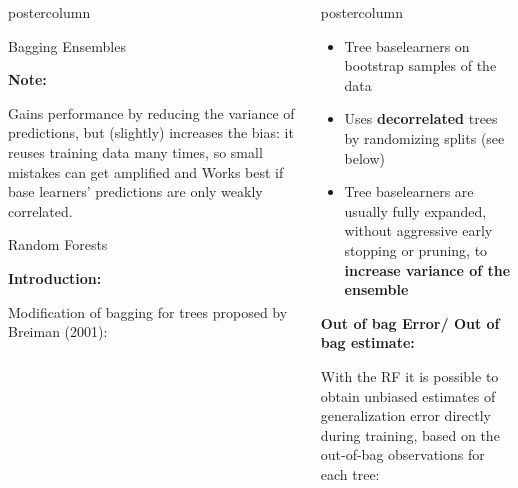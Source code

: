 \documentclass{beamer}
\newlength{\columnheight} %
\begin{document}
\begin{frame}[fragile]{}
\begin{columns}
\begin{column}{.31\textwidth}
\begin{beamercolorbox}[center]{postercolumn}
\begin{minipage}{.98\textwidth}
{\begin{myblock}{Bagging Ensembles}
						\begin{codebox}
			\textbf{Note: }
						\end{codebox}
						Gains performance by reducing the variance of predictions, but (slightly) increases the bias: it reuses training data many times, so small mistakes can get amplified and Works best if base learners' predictions are only weakly correlated.
						
             \end{myblock}
             
        \begin{myblock}{Random Forests}
        \begin{codebox} \textbf{Introduction: }
        \end{codebox}
        Modification of bagging for trees proposed by Breiman (2001):
\end{myblock}\vfill
				}
			\end{minipage}
		\end{beamercolorbox}
	\end{column}
	

\begin{column}{.31\textwidth}
\begin{beamercolorbox}[center]{postercolumn}
\begin{minipage}{.98\textwidth}
\parbox[t][\columnheight]{\textwidth}{

  \begin{myblock}{ }
  \begin{itemize}[$\bullet$]     
  \setlength{\itemindent}{+.3in}
  \item Tree baselearners on bootstrap samples of the data
  \item Uses \textbf{decorrelated} trees by randomizing splits (see below)
  \item Tree baselearners are usually fully expanded, without aggressive early stopping or pruning, to \textbf{increase variance of the ensemble}
  \end{itemize}
  
  \begin{codebox}
  \textbf{Out of bag Error/ Out of bag estimate:}
  \end{codebox}
  With the RF it is possible to obtain unbiased estimates of generalization error directly during training, based on the out-of-bag observations for each tree:
  

\end{myblock}}
\end{minipage}
\end{beamercolorbox}
\end{column}
\end{columns}
\end{frame}
\end{document}
